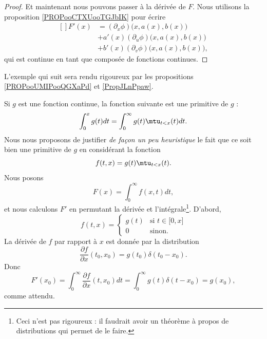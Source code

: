 \begin{proof}
	Et maintenant nous pouvons passer à la dérivée de \( F\). Nous utilisons la proposition \ref{PROPooCTXUooTGJbIK} pour écrire
	\begin{equation}
		\begin{aligned}[]
			F'(x) & =(\partial_x\phi)\big( x,a(x),b(x) \big)       \\
			      & +a'(x)(\partial_u\phi)\big( x,a(x),b(x) \big)  \\
			      & +b'(x)(\partial_v\phi)\big( x,a(x),b(x) \big),
		\end{aligned}
	\end{equation}
	qui est continue en tant que composée de fonctions continues.
\end{proof}

L'exemple qui suit sera rendu rigoureux par les propositions \ref{PROPooUMIPooQGXaPd} et \ref{PropJLnPpaw}.

\begin{example} \label{ExfYXeQg}
	Si \( g\) est une fonction continue, la fonction suivante est une primitive de \( g\) :
	\begin{equation}
		\int_0^xg(t)dt=\int_0^{\infty}g(t)\mtu_{t<x}(t)dt.
	\end{equation}
	Nous nous proposons de justifier \emph{de façon un peu heuristique} le fait que ce soit bien une primitive de \( g\) en considérant la fonction
	\begin{equation}
		f(t,x)=g(t)\mtu_{t<x}(t).
	\end{equation}
	Nous posons
	\begin{equation}
		F(x)=\int_0^{\infty}f(x,t)dt,
	\end{equation}
	et nous calculons \( F'\) en permutant la dérivée et l'intégrale\footnote{Ceci n'est pas rigoureux : il faudrait avoir un théorème à propos de distributions qui permet de le faire.}. D'abord,
	\begin{equation}
		f(t,x)=\begin{cases}
			g(t) & \text{si } t\in \mathopen[ 0 , x \mathclose] \\
			0    & \text{sinon.}
		\end{cases}
	\end{equation}
	La dérivée de \( f\) par rapport à \( x\) est donnée par la distribution
	\begin{equation}
		\frac{ \partial f }{ \partial x }(t_0,x_0)=g(t_0)\delta(t_0-x_0).
	\end{equation}
	Donc
	\begin{equation}
		F'(x_0)=\int_0^{\infty}\frac{ \partial f }{ \partial x }(t,x_0)dt=\int_0^{\infty}g(t)\delta(t-x_0)=g(x_0),
	\end{equation}
	comme attendu.
\end{example}



